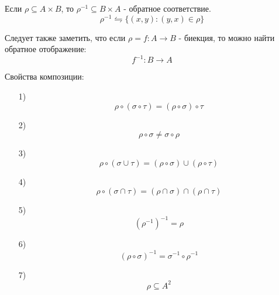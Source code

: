 \begin{definition}
Если $\rho \subseteq A\times B$, то $\rho^{-1} \subseteq B\times A$ - обратное соответствие. \[
\rho^{-1} \leftrightharpoons \{(x,y):(y,x) \in \rho\} 
\] 
\end{definition}

Следует также заметить, что если $\rho=f:A\to B$ - биекция, то можно найти обратное
отображение: \[
f^{-1}:B\to A
\] 

\medskip

Свойства композиции:
\begin{itemize}
	\item[1)] \[
	\rho \circ (\sigma \circ \tau) = (\rho \circ \sigma) \circ \tau
	\]
\item[2)] \[
\rho \circ \sigma \neq \sigma \circ \rho
\]
\item[3)] \[
\rho \circ (\sigma \cup \tau) = (\rho \circ \sigma) \cup (\rho \circ \tau)
\] 
\item[4)] \[
\rho \circ (\sigma \cap \tau) = (\rho \cap \sigma) \cap (\rho \cap \tau)
\]
\item[5)] \[
		(\rho^{-1})^{-1}=\rho
\]
\item[6)] \[
		(\rho \circ \sigma)^{-1} = \sigma^{-1} \circ \rho^{-1}
\]
\item[7)] \[
\rho \subseteq A^2
\] 
\end{itemize}



